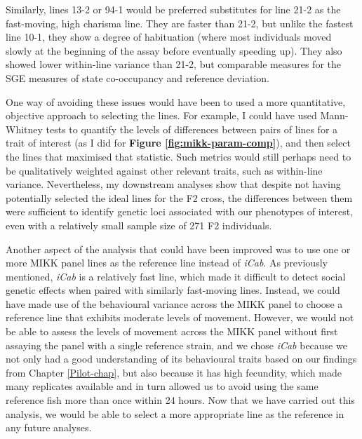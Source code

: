 \documentclass[
]{book}
\begin{document}
Similarly, lines \textcolor{13-2_F57A5F}{13-2} or \textcolor{94-1_D39200}{94-1} would be preferred substitutes for line \textcolor{21-2_49B500}{21-2} as the fast-moving, high charisma line. They are faster than \textcolor{21-2_49B500}{21-2}, but unlike the fastest line \textcolor{10-1_F8766D}{10-1}, they show a degree of habituation (where most individuals moved slowly at the beginning of the assay before eventually speeding up). They also showed lower within-line variance than \textcolor{21-2_49B500}{21-2}, but comparable measures for the SGE measures of state co-occupancy and reference deviation.

One way of avoiding these issues would have been to used a more quantitative, objective approach to selecting the lines. For example, I could have used Mann-Whitney tests to quantify the levels of differences between pairs of lines for a trait of interest (as I did for \textbf{Figure \ref{fig:mikk-param-comp}}), and then select the lines that maximised that statistic. Such metrics would still perhaps need to be qualitatively weighted against other relevant traits, such as within-line variance. Nevertheless, my downstream analyses show that despite not having potentially selected the ideal lines for the F2 cross, the differences between them were sufficient to identify genetic loci associated with our phenotypes of interest, even with a relatively small sample size of 271 F2 individuals.

Another aspect of the analysis that could have been improved was to use one or more MIKK panel lines as the reference line instead of \emph{\textcolor{iCab_424B4D}{iCab}}. As previously mentioned, \emph{\textcolor{iCab_424B4D}{iCab}} is a relatively fast line, which made it difficult to detect social genetic effects when paired with similarly fast-moving lines. Instead, we could have made use of the behavioural variance across the MIKK panel to choose a reference line that exhibits moderate levels of movement. However, we would not be able to assess the levels of movement across the MIKK panel without first assaying the panel with a single reference strain, and we chose \emph{\textcolor{iCab_424B4D}{iCab}} because we not only had a good understanding of its behavioural traits based on our findings from Chapter \ref{Pilot-chap}, but also because it has high fecundity, which made many replicates available and in turn allowed us to avoid using the same reference fish more than once within 24 hours. Now that we have carried out this analysis, we would be able to select a more appropriate line as the reference in any future analyses.
\end{document}
